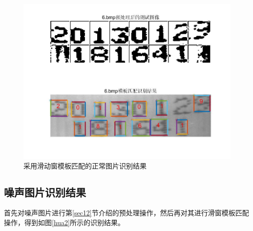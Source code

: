 \documentclass[cn]{elegantbook}
\begin{document}
\begin{figure}[!h]
\begin{minipage}[t]{0.48\textwidth}
	\end{minipage}
	\begin{minipage}[t]{0.48\textwidth}
		\centering
		\includegraphics[width=\textwidth]{save6}
	\end{minipage}
	\caption{\label{hua1}采用滑动窗模板匹配的正常图片识别结果}
\end{figure}

\subsection{噪声图片识别结果}

首先对噪声图片进行第\ref{sec12}节介绍的预处理操作，然后再对其进行滑窗模板匹配操作，得到如图\ref{hua2}所示的识别结果。
\end{document}
